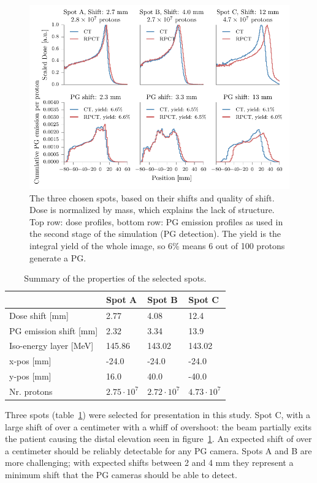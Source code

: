 \documentclass[a4paper,english]{article}
\begin{document}
\begin{figure}[htp]
  \centering
  \includegraphics[width=0.99\linewidth]{spotprofiles}
  \caption{The three chosen spots, based on their shifts and quality of shift. Dose is normalized by mass, which explains the lack of structure. Top row: dose profiles, bottom row: PG emission profiles as used in the second stage of the simulation (PG detection). The yield is the integral yield of the whole image, so 6\% means 6 out of 100 protons generate a PG.}
  \label{fig:the-spots}
\end{figure}

\begin{table}
\centering
\begin{tabular}{llll}
	 & Spot A & Spot B & Spot C\\
	\midrule
	Dose shift [mm] & 2.77 & 4.08 & 12.4\\
	PG emission shift [mm] & 2.32 & 3.34 & 13.9\\
	\midrule
	Iso-energy layer [MeV] & 145.86 & 143.02 & 143.02 \\
	x-pos [mm] & -24.0 &  -24.0 &  -24.0 \\
	y-pos [mm] & 16.0 & 40.0 & -40.0 \\
	Nr. protons & $2.75\cdot10^7$ & $2.72\cdot10^7$ & $4.73\cdot10^7$ \\
\end{tabular}
\caption{Summary of the properties of the selected spots.}
\label{table:spotselec}
\end{table}

Three spots (table~\ref{table:spotselec}) were selected for presentation in this study. Spot C, with a large shift of over a centimeter with a whiff of overshoot: the beam partially exits the patient causing the distal elevation seen in figure~\ref{fig:the-spots}. An expected shift of over a centimeter should be reliably detectable for any PG camera. Spots A and B are more challenging; with expected shifts between 2 and 4 mm they represent a minimum shift that the PG cameras should be able to detect.
\end{document}
